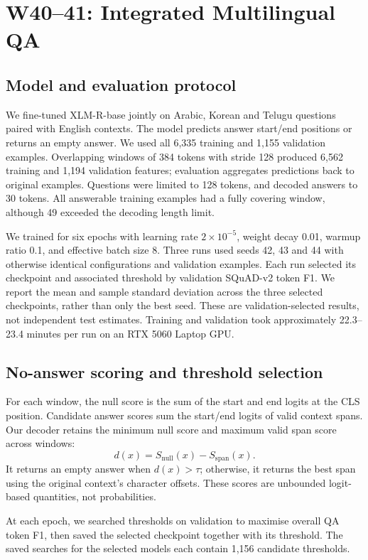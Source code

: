 \documentclass[11pt,a4paper]{article}
\begin{document}
\section{W40--41: Integrated Multilingual QA}

\subsection{Model and evaluation protocol}
We fine-tuned XLM-R-base jointly on Arabic, Korean and Telugu
questions paired with English contexts. The model predicts answer
start/end positions or returns an empty answer. We used all 6,335
training and 1,155 validation examples. Overlapping windows of
384 tokens with stride 128 produced 6,562 training and 1,194
validation features; evaluation aggregates predictions back to
original examples. Questions were limited to 128 tokens, and
decoded answers to 30 tokens. All answerable training examples
had a fully covering window, although 49 exceeded the decoding
length limit.

We trained for six epochs with learning rate $2\times10^{-5}$,
weight decay 0.01, warmup ratio 0.1, and effective batch size 8.
Three runs used seeds 42, 43 and 44 with otherwise identical
configurations and validation examples. Each run selected its
checkpoint and associated threshold by validation SQuAD-v2
token F1. We report the mean and sample standard deviation
across the three selected checkpoints, rather than only the
best seed. These are validation-selected results, not independent
test estimates. Training and validation took approximately
22.3--23.4 minutes per run on an RTX 5060 Laptop GPU.

\subsection{No-answer scoring and threshold selection}
For each window, the null score is the sum of the start and end
logits at the CLS position. Candidate answer scores sum the
start/end logits of valid context spans. Our decoder retains the
minimum null score and maximum valid span score across windows:
\[
d(x)=S_{\mathrm{null}}(x)-S_{\mathrm{span}}(x).
\]
It returns an empty answer when $d(x)>\tau$; otherwise, it returns
the best span using the original context's character offsets.
These scores are unbounded logit-based quantities, not
probabilities.

At each epoch, we searched thresholds on validation to maximise
overall QA token F1, then saved the selected checkpoint together
with its threshold. The saved searches for the selected models
each contain 1,156 candidate thresholds.
\end{document}
